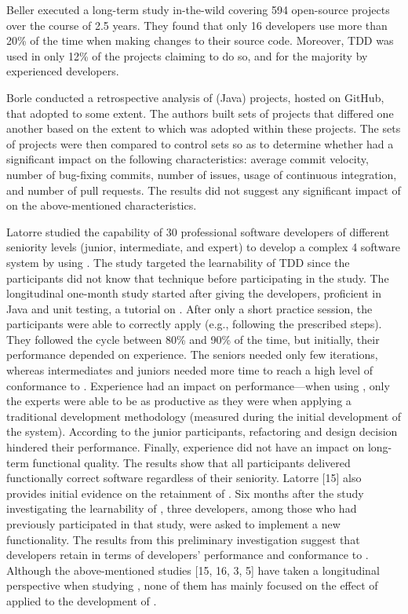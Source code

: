 Beller \etal \cite{DBLP:journals/tse/BellerGPPAZ19} executed a long-term study in-the-wild covering 594 open-source projects over the course of 2.5 years. They found that only 16 developers use \tdd more than 20\% of the time when making changes to their source code.
Moreover, TDD was used in only 12\% of the projects claiming to do so, and for the majority by experienced developers.

Borle \etal \cite{DBLP:journals/ese/BorleFSGH18} conducted a retrospective analysis of (Java) projects, hosted on GitHub, that adopted \tdd to some extent. The authors built sets of \tdd projects that differed one another based on the extent to which \tdd was adopted within these projects. The sets of \tdd projects were then compared to control sets so as to determine whether \tdd had a significant impact on the following characteristics: average commit velocity, number of bug-fixing commits, number of issues, usage of continuous integration, and number of pull requests. The results did not suggest any significant impact of \tdd on the above-mentioned characteristics.

Latorre \cite{DBLP:journals/tse/Latorre14} studied the capability of 30 professional software developers of different seniority levels (junior, intermediate, and expert) to develop a complex 4 software system by using \tdd. The study targeted the learnability of TDD since the participants did not know that technique before participating in the study. The longitudinal one-month study started after giving the developers, proficient in Java and unit testing, a tutorial on \tdd. After only a short practice session, the participants were able to correctly apply \tdd (e.g., following the prescribed steps). They followed the \tdd cycle between 80\% and 90\% of the time, but initially, their performance depended on experience. The seniors needed only few iterations, whereas intermediates and juniors needed more time to reach a high level of conformance to \tdd. Experience had an impact on performance—when using \tdd, only the experts were able to be as productive as they were when applying a traditional development methodology (measured during the initial development of the system). According to the junior participants, refactoring and design decision hindered their performance. Finally, experience did not have an impact on long-term functional quality. The results show that all participants delivered functionally correct software regardless of their seniority. Latorre [15] also provides initial evidence on the retainment of \tdd. Six months after the study investigating the learnability of \tdd, three developers, among those who had previously participated in that study, were asked to implement a new functionality. The results from this preliminary investigation suggest that developers retain \tdd in terms of developers' performance and conformance to \tdd.
Although the above-mentioned studies [15, 16, 3, 5] have taken a longitudinal perspective when studying \tdd, none of them has mainly focused on the effect of \tdd applied to the development of \ess.


